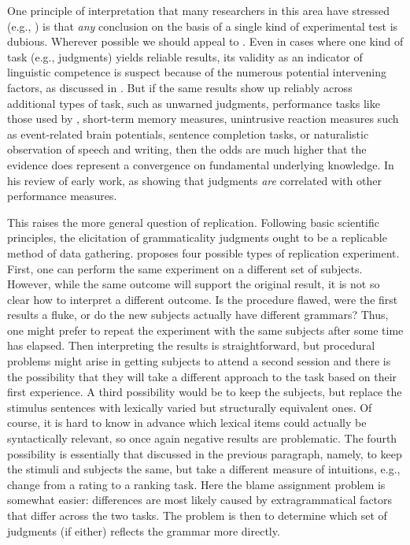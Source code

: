  One principle  of interpretation  that many researchers in this area have stressed (e.g., \citet{Chaudron1983}) is that \textit{any} conclusion on the basis of a single kind of experimental test is dubious. Wherever possible we should appeal to  \citep{CardenEtAl1981}. Even in cases where one kind of task (e.g., judgments) yields reliable results, its validity as an indicator of linguistic competence is suspect because of the numerous potential intervening factors, as discussed in . But if the same results show up reliably across additional types of task, such as unwarned judgments, performance tasks like those used by \citet{QuirkEtAl1966}, short-term memory measures, unintrusive reaction measures such as event-related brain potentials, sentence completion tasks, or naturalistic observation of speech and writing, then the odds are much higher that the evidence does represent a convergence on fundamental underlying knowledge. In his review of early work, \citet{Carden1976b}
 as showing that judgments \textit{are} correlated with other performance measures.

 This raises the more general question of replication. Following basic scientific principles, the elicitation of grammaticality judgments ought to be a replicable method of data gathering. \citet{Greenbaum1977c} proposes four possible types
 of replication experiment. First, one can perform the same experiment on a different set of subjects. However, while the same outcome will support the original result, it is not so clear how to interpret a different outcome. Is the procedure flawed, were the first results a fluke, or do the new subjects actually have different grammars? Thus, one might prefer to repeat the experiment with the same subjects after some time has elapsed. Then interpreting  the results 
 is straightforward,  but
 procedural problems might arise in getting subjects to attend a 
 second session
 and there is the possibility that they will take a different approach to the task based on their first experience. A third possibility would be to keep the subjects,  but replace the stimulus sentences with lexically varied but structurally
 equivalent  ones. Of  course, it is hard to know  in  advance which  lexical items
 could actually be syntactically relevant, so once again negative results are problematic. The fourth possibility is essentially that discussed in the previous paragraph, namely, to keep the stimuli and subjects the same, but take a different measure of intuitions, e.g., change from a rating to a ranking task. Here the blame assignment problem is somewhat easier: differences are most likely caused by extragrammatical factors that differ across the two tasks. The problem is then to determine which set of judgments (if either) reflects the grammar more directly.

